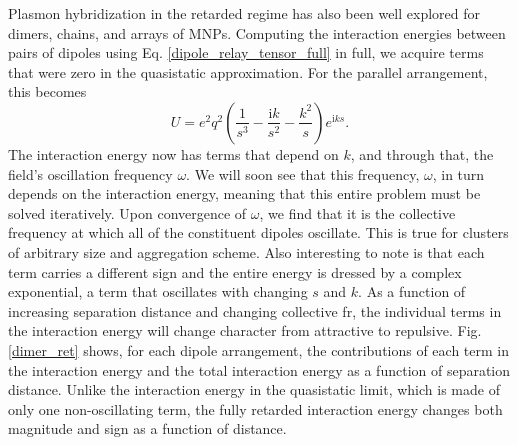 \documentclass [11pt, proquest] {uwthesis}[2016/11/22]
\begin{document}
Plasmon hybridization in the retarded regime has also been well explored for dimers, chains, and arrays of MNPs. Computing the interaction energies between pairs of dipoles using Eq. \ref{dipole_relay_tensor_full} in full, we acquire terms that were zero in the quasistatic approximation. For the parallel arrangement, this becomes
\begin{equation}
U = e^2q^2\left(\frac{1}{s^3}-\frac{\textrm{i}k}{s^2}-\frac{k^2}{s}\right)e^{\textrm{i}ks}.
\label{int_ret}
\end{equation}
The interaction energy now has terms that depend on $k$, and through that, the field's oscillation frequency $\omega$. We will soon see that this frequency, $\omega$, in turn depends on the interaction energy, meaning that this entire problem must be solved iteratively. Upon convergence of $\omega$, we find that it is the collective frequency at which all of the constituent dipoles oscillate. This is true for clusters of arbitrary size and aggregation scheme. Also interesting to note is that each term carries a different sign and the entire energy is dressed by a complex exponential, a term that oscillates with changing $s$ and $k$. As a function of increasing separation distance and changing collective fr, the individual terms in the interaction energy will change character from attractive to repulsive. Fig. \ref{dimer_ret} shows, for each dipole arrangement, the contributions of each term in the interaction energy and the total interaction energy as a function of separation distance. Unlike the interaction energy in the quasistatic limit, which is made of only one non-oscillating term, the fully retarded interaction energy changes both magnitude and sign as a function of distance.
\end{document}

